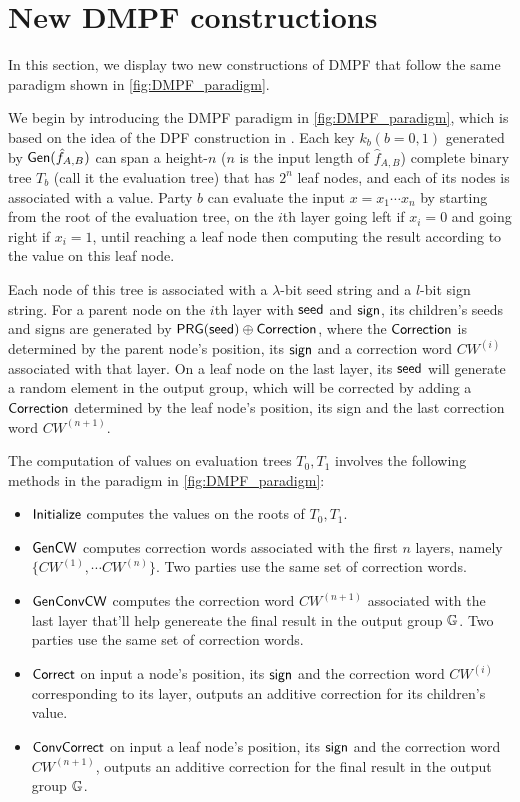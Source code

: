 \section{New DMPF constructions}
In this section, we display two new constructions of DMPF that follow the same paradigm shown in \cref{fig:DMPF_paradigm}. 

We begin by introducing the DMPF paradigm in \cref{fig:DMPF_paradigm}, which is based on the idea of the DPF construction in \cite{CCS:BoyGilIsh16}. Each key $k_b(b=0,1)$ generated by ${\sf Gen}(\hat{f}_{A,B})$ can span a height-$n$ ($n$ is the input length of $\hat{f}_{A,B}$) complete binary tree $T_b$ (call it the evaluation tree) that has $2^n$ leaf nodes, and each of its nodes is associated with a value. Party $b$ can evaluate the input $x=x_1\cdots x_n$ by starting from the root of the evaluation tree, on the $i$th layer going left if $x_i=0$ and going right if $x_i=1$, until reaching a leaf node then computing the result according to the value on this leaf node. 

Each node of this tree is associated with a $\lambda$-bit seed string and a $l$-bit sign string. For a parent node on the $i$th layer with ${\sf seed}$ and ${\sf sign}$, its children's seeds and signs are generated by $\sf PRG({\sf seed})\oplus Correction$, where the $\sf Correction$ is determined by the parent node's position, its ${\sf sign}$ and a correction word $CW^{(i)}$ associated with that layer. On a leaf node on the last layer, its ${\sf seed}$ will generate a random element in the output group, which will be corrected by adding a $\sf Correction$ determined by the leaf node's position, its sign and the last correction word $CW^{(n+1)}$.

The computation of values on evaluation trees $T_0,T_1$ involves the following methods in the paradigm in \cref{fig:DMPF_paradigm}: 
\begin{itemize}
  \item $\sf Initialize$ computes the values on the roots of $T_0,T_1$.
  \item $\sf GenCW$ computes correction words associated with the first $n$ layers, namely $\{CW^{(1)},\cdots CW^{(n)}\}$. Two parties use the same set of correction words. 
  \item $\sf GenConvCW$ computes the correction word $CW^{(n+1)}$ associated with the last layer that'll help genereate the final result in the output group $\mathbb{G}$. Two parties use the same set of correction words. 
  \item $\sf Correct$ on input a node's position, its ${\sf sign}$ and the correction word $CW^{(i)}$ corresponding to its layer, outputs an additive correction for its children's value. 
  \item $\sf ConvCorrect$ on input a leaf node's position, its ${\sf sign}$ and the correction word $CW^{(n+1)}$, outputs an additive correction for the final result in the output group $\mathbb{G}$. 
\end{itemize}

